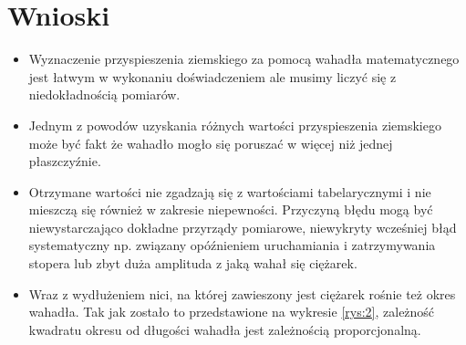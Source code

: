 \documentclass [a4paper,11pt]{article}
\begin{document}
\section{Wnioski}
\begin{itemize}
\item Wyznaczenie przyspieszenia ziemskiego za pomocą wahadła matematycznego jest łatwym w wykonaniu doświadczeniem ale musimy liczyć się z niedokładnością pomiarów.
\item Jednym z powodów uzyskania różnych wartości przyspieszenia ziemskiego może być fakt że wahadło mogło się poruszać w więcej niż jednej płaszczyźnie.
\item Otrzymane wartości nie zgadzają się z wartościami tabelarycznymi i nie mieszczą się również w zakresie niepewności. Przyczyną błędu mogą być niewystarczająco dokładne przyrządy pomiarowe, niewykryty wcześniej błąd systematyczny np. związany opóźnieniem uruchamiania i zatrzymywania stopera lub zbyt duża amplituda z jaką wahał się ciężarek.  
\item Wraz z wydłużeniem nici, na której zawieszony jest ciężarek rośnie też okres wahadła. Tak jak zostało to przedstawione na wykresie {\ref{rys:2}}, zależność kwadratu okresu od długości wahadła jest zależnością proporcjonalną.
\end{itemize}
\end{document}

